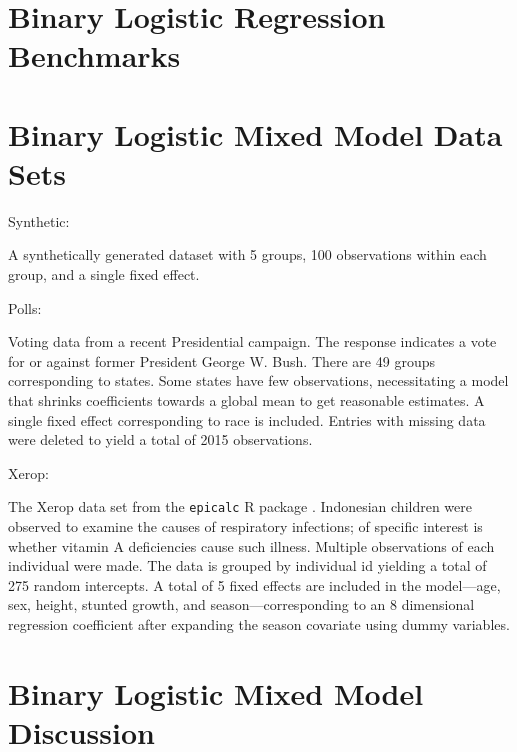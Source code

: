 \documentclass[11pt]{article}
\begin{document}
\section{Binary Logistic Regression Benchmarks}
\label{sec:blogit-benchmarks}

% 


\pagebreak

\section{Binary Logistic Mixed Model Data Sets}

\begin{outline}

\1 Synthetic:

A synthetically generated dataset with 5 groups, 100 observations within each
group, and a single fixed effect.

\1 Polls:

Voting data from a recent Presidential campaign.  The response indicates a vote
for or against former President George W. Bush.  There are 49 groups
corresponding to states.  Some states have few observations, necessitating a
model that shrinks coefficients towards a global mean to get reasonable
estimates.  A single fixed effect corresponding to race is included.  Entries
with missing data were deleted to yield a total of 2015 observations.

\1 Xerop:

The Xerop data set from the \texttt{epicalc} R package \citep{epicalc-2012}.
Indonesian children were observed to examine the causes of respiratory
infections; of specific interest is whether vitamin A deficiencies cause such
illness.  Multiple observations of each individual were made.  The data is
grouped by individual id yielding a total of 275 random intercepts.  A total of
5 fixed effects are included in the model---age, sex, height, stunted growth,
and season---corresponding to an 8 dimensional regression coefficient after
expanding the season covariate using dummy variables.

\end{outline}

\section{Binary Logistic Mixed Model Discussion}
\label{sec:logitmm-discussion}
\end{document}
